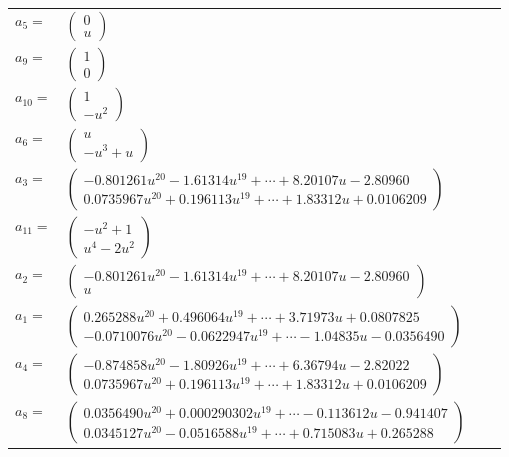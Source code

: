 \documentclass[1p]{elsarticle_modified}
\theoremstyle{definition}
\begin{document}
\begin{tabular}{m{7pt} m{180pt} m{7pt} m{180pt} }
\flushright $a_{5}=$&$\begin{pmatrix}0\\u\end{pmatrix}$ \\
\flushright $a_{9}=$&$\begin{pmatrix}1\\0\end{pmatrix}$ \\
\flushright $a_{10}=$&$\begin{pmatrix}1\\- u^2\end{pmatrix}$ \\
\flushright $a_{6}=$&$\begin{pmatrix}u\\- u^3+u\end{pmatrix}$ \\
\flushright $a_{3}=$&$\begin{pmatrix}-0.801261 u^{20}-1.61314 u^{19}+\cdots+8.20107 u-2.80960\\0.0735967 u^{20}+0.196113 u^{19}+\cdots+1.83312 u+0.0106209\end{pmatrix}$ \\
\flushright $a_{11}=$&$\begin{pmatrix}- u^2+1\\u^4-2 u^2\end{pmatrix}$ \\
\flushright $a_{2}=$&$\begin{pmatrix}-0.801261 u^{20}-1.61314 u^{19}+\cdots+8.20107 u-2.80960\\u\end{pmatrix}$ \\
\flushright $a_{1}=$&$\begin{pmatrix}0.265288 u^{20}+0.496064 u^{19}+\cdots+3.71973 u+0.0807825\\-0.0710076 u^{20}-0.0622947 u^{19}+\cdots-1.04835 u-0.0356490\end{pmatrix}$ \\
\flushright $a_{4}=$&$\begin{pmatrix}-0.874858 u^{20}-1.80926 u^{19}+\cdots+6.36794 u-2.82022\\0.0735967 u^{20}+0.196113 u^{19}+\cdots+1.83312 u+0.0106209\end{pmatrix}$ \\
\flushright $a_{8}=$&$\begin{pmatrix}0.0356490 u^{20}+0.000290302 u^{19}+\cdots-0.113612 u-0.941407\\0.0345127 u^{20}-0.0516588 u^{19}+\cdots+0.715083 u+0.265288\end{pmatrix}$ \\

\end{tabular}
\end{document}
